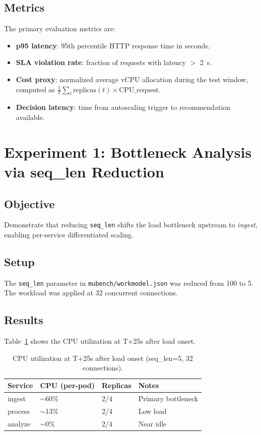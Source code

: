 \subsection{Metrics}
The primary evaluation metrics are:
\begin{itemize}
  \item \textbf{p95 latency}: 95th percentile HTTP response time in seconds.
  \item \textbf{SLA violation rate}: fraction of requests with latency $>$ 2~s.
  \item \textbf{Cost proxy}: normalized average vCPU allocation during the test
  window, computed as $\frac{1}{T}\sum_{t} \text{replicas}(t) \times
  \text{CPU\_request}$.
  \item \textbf{Decision latency}: time from autoscaling trigger to recommendation
  available.
\end{itemize}

\section{Experiment 1: Bottleneck Analysis via seq\_len Reduction}
\label{sec:exp1}

\subsection{Objective}
Demonstrate that reducing \texttt{seq\_len} shifts the load bottleneck upstream
to \textit{ingest}, enabling per-service differentiated scaling.

\subsection{Setup}
The \texttt{seq\_len} parameter in \texttt{mubench/workmodel.json} was reduced
from 100 to 5. The workload was applied at 32 concurrent connections.

\subsection{Results}
Table~\ref{tab:exp1-cpu} shows the CPU utilization at T+25s after load onset.

\begin{table}[h]
  \centering
  \caption{CPU utilization at T+25s after load onset (seq\_len=5, 32 connections).}
  \label{tab:exp1-cpu}
  \begin{tabular}{llll}
    \toprule
    Service & CPU (per-pod) & Replicas & Notes \\
    \midrule
    ingest  & $\sim$60\%    & 2/4      & Primary bottleneck \\
    process & $\sim$13\%    & 2/4      & Low load \\
    analyze & $\sim$0\%     & 2/4      & Near idle \\
    \bottomrule
  \end{tabular}
\end{table}


